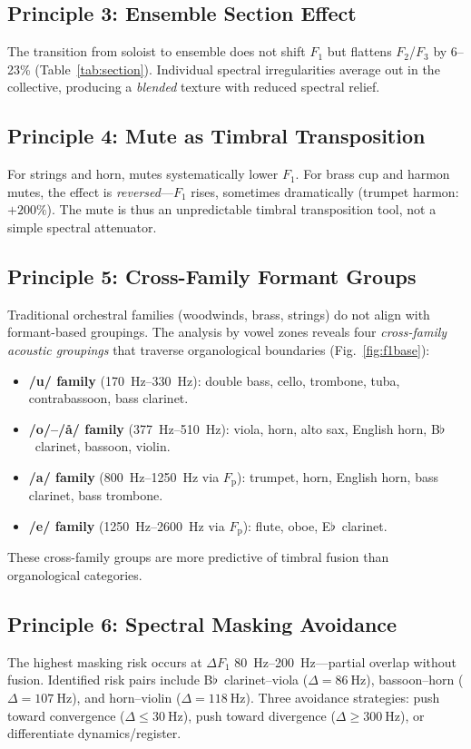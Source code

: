 \documentclass[journal]{IEEEtran}
\newcommand{\Fp}{F_\mathrm{p}}
\newcommand{\Fn}[1]{F_{#1}}
\begin{document}
\subsection{Principle 3: Ensemble Section Effect}
The transition from soloist to ensemble does not shift $\Fn{1}$ but flattens $\Fn{2}$/$\Fn{3}$ by 6--23\% (Table~\ref{tab:section}). Individual spectral irregularities average out in the collective, producing a \emph{blended} texture with reduced spectral relief.

\subsection{Principle 4: Mute as Timbral Transposition}
For strings and horn, mutes systematically lower $\Fn{1}$. For brass cup and harmon mutes, the effect is \emph{reversed}---$\Fn{1}$ rises, sometimes dramatically (trumpet harmon: $+200\%$). The mute is thus an unpredictable timbral transposition tool, not a simple spectral attenuator.

\subsection{Principle 5: Cross-Family Formant Groups}
Traditional orchestral families (woodwinds, brass, strings) do not align with formant-based groupings. The analysis by vowel zones reveals four \emph{cross-family acoustic groupings} that traverse organological boundaries (Fig.~\ref{fig:f1base}):
\begin{itemize}
\item \textbf{/u/ family} (\SIrange{170}{330}{\hertz}): double bass, cello, trombone, tuba, contrabassoon, bass clarinet.
\item \textbf{/o/--/\aa/ family} (\SIrange{377}{510}{\hertz}): viola, horn, alto sax, English horn, B$\flat$~clarinet, bassoon, violin.
\item \textbf{/a/ family} (\SIrange{800}{1250}{\hertz} via $\Fp$): trumpet, horn, English horn, bass clarinet, bass trombone.
\item \textbf{/e/ family} (\SIrange{1250}{2600}{\hertz} via $\Fp$): flute, oboe, E$\flat$~clarinet.
\end{itemize}
These cross-family groups are more predictive of timbral fusion than organological categories.

\subsection{Principle 6: Spectral Masking Avoidance}
The highest masking risk occurs at $\Delta\Fn{1}$ \SIrange{80}{200}{\hertz}---partial overlap without fusion. Identified risk pairs include B$\flat$~clarinet--viola ($\Delta = \SI{86}{\hertz}$), bassoon--horn ($\Delta = \SI{107}{\hertz}$), and horn--violin ($\Delta = \SI{118}{\hertz}$). Three avoidance strategies: push toward convergence ($\Delta \leq \SI{30}{\hertz}$), push toward divergence ($\Delta \geq \SI{300}{\hertz}$), or differentiate dynamics/register.
\end{document}
